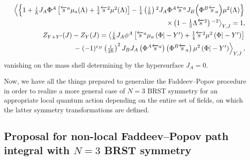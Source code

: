 \documentclass[10pt]{article}
\begin{document}
\begin{eqnarray}
&&\textstyle\left\langle \left\{ 1+\frac{i}{\hbar }J_{A}\Phi ^{A}\left[
\overleftarrow{s}^{a}\mu _{a}(\Lambda )+\frac{1}{4}\overleftarrow{s}^{2}\mu
^{2}(\Lambda )\right] -\frac{1}{4}\left( \frac{i}{\hbar }\right)
{}^{2}J_{A}\Phi ^{A}\overleftarrow{s}^{a}J_{B}\Big(\Phi ^{B}\overleftarrow{s}%
_{a}\Big)\mu ^{2}(\Lambda )\right\} \right.  \label{mWIN2} \\
&&\qquad \left. \times \textstyle\left( 1-\frac{1}{2}\Lambda \overleftarrow{s}%
^{2}\right) {}^{-2}\right\rangle _{Y,J}=1,  \nonumber \\
&&Z_{Y+Y^{\prime }}(J)-Z_{Y}(J) =\textstyle\left\langle \frac{i}{%
\hbar }J_{A}\phi ^{A}\left[ \overleftarrow{s}^{a}\mu _{a}\left( \Phi |-{Y}%
^{\prime }\right) +\frac{1}{4}\overleftarrow{s}^{2}\mu ^{2}\left( \Phi |-{Y%
}^{\prime }\right) \right] \right.   \nonumber \\
&&\qquad -\left.  \textstyle(-1)^{\varepsilon _{B}}\left( \frac{i}{2\hbar }%
\right) ^{2}J_{B}J_{A}\left( \Phi ^{A}\overleftarrow{s}{}^{a}\right) \left(
\Phi ^{B}\overleftarrow{s}_{a}\right) \mu ^{2}\left( \Phi |-{Y}^{\prime
}\right) \right\rangle _{Y,J} ,  \label{GDInewN2}
\end{eqnarray}%
vanishing on the mass shell determining by the hypersurface $J_A=0$.

Now, we have all the things prepared to generalize the Faddeev--Popov procedure
in order to realize a more general case of $N=3$  BRST symmetry for an appropriate
local quantum action depending on the entire set of fields, on which the latter symmetry
transformations are defined.

\subsection{Proposal for non-local Faddeev--Popov path integral with $N=3$ BRST symmetry}\label{N3FPtrick}
\end{document}
